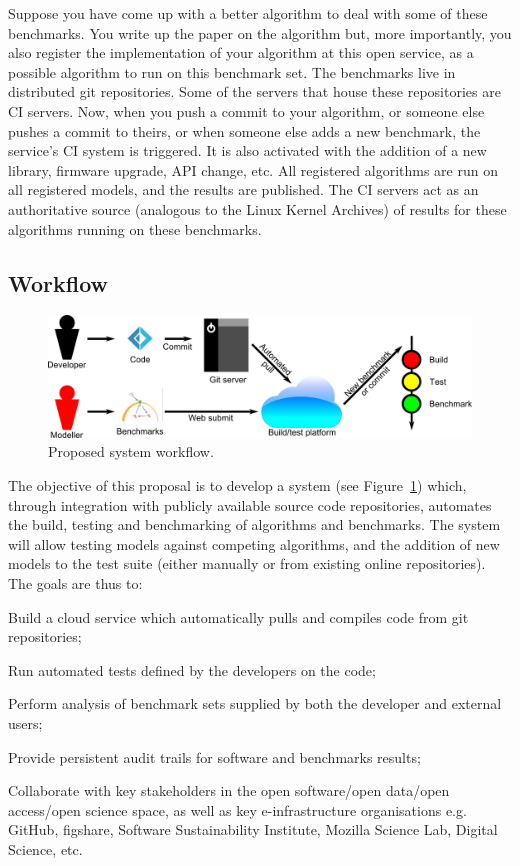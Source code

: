 \documentclass[a4paper,10pt]{article}
\begin{document}
Suppose you have come up with a better algorithm to deal with some of
these benchmarks. You write up the paper on the algorithm but, more
importantly, you also register the implementation of your algorithm at
this open service, as a possible algorithm to run on this benchmark
set. The benchmarks live in distributed git repositories. Some of the
servers that house these repositories are CI servers. Now, when you
push a commit to your algorithm, or someone else pushes a commit to
theirs, or when someone else adds a new benchmark, the service's CI
system is triggered. It is also activated with the addition of a new
library, firmware upgrade, API change, etc. All registered algorithms
are run on all registered models, and the results are published. The
CI servers act as an authoritative source (analogous to the Linux
Kernel Archives) of results for these algorithms running on these
benchmarks.

\subsection*{Workflow}

\begin{figure}[!h]
\centering
\includegraphics[width=\columnwidth]{workflow.png}
\caption{Proposed system workflow.}
\label{fig:workflow}
\end{figure}

The objective of this proposal is to develop a system (see
Figure~\ref{fig:workflow}) which, through integration with publicly
available source code repositories, automates the build, testing and
benchmarking of algorithms and benchmarks. The system will allow
testing models against competing algorithms, and the addition of new
models to the test suite (either manually or from existing online
repositories). The goals are thus to:\\

\begin{compactitem}
	\item Build a cloud service which automatically pulls and compiles
code from git repositories;
\item Run automated tests defined by the developers on the code;
\item Perform analysis of benchmark sets supplied by both the developer and external
users;
\item Provide persistent audit trails for software and benchmarks results;
\item Collaborate with key stakeholders in the open software/open data/open access/open
  science space, as well as key e-infrastructure organisations
  e.g. GitHub, figshare, Software Sustainability
  Institute, Mozilla Science Lab, Digital Science, etc.
\end{compactitem}
\end{document}
